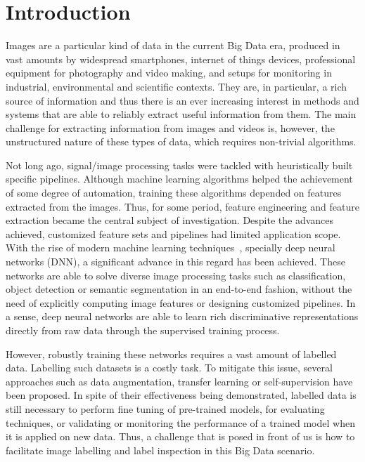 \documentclass[sn-basic]{sn-jnl}%
\theoremstyle{thmstyleone}%
\theoremstyle{thmstyletwo}%
\theoremstyle{thmstylethree}%
\begin{document}
\section{Introduction}\label{sec1}

Images are a particular kind of data in the current Big Data era, produced in vast amounts by widespread smartphones, internet of things devices, professional equipment for photography and video making, and setups for monitoring in industrial, environmental and scientific contexts. They are, in particular, a rich source of information and thus there is an ever increasing interest in methods and systems that are able to reliably extract useful information from them. The main challenge for extracting information from images and videos is, however, the unstructured nature of these types of data, which requires non-trivial algorithms.

Not long ago, signal/image processing tasks were tackled with heuristically built specific pipelines. Although machine learning algorithms helped the achievement of some degree of automation, training these algorithms depended on features extracted from the images. Thus, for some period, feature engineering and feature extraction became the central subject of investigation. Despite the advances achieved, customized feature sets and pipelines had limited application scope. With the rise of modern machine learning techniques~\citep{goodfellow-book}, specially deep neural networks (DNN), a significant advance in this regard has been achieved. These networks are able to solve diverse image processing tasks such as classification, object detection or semantic segmentation in an end-to-end fashion, without the need of explicitly computing image features or designing customized pipelines. In a sense, deep neural networks are able to learn rich discriminative representations directly from raw data through the supervised training process.

However, robustly training these networks requires a vast amount of labelled data. Labelling such datasets is a costly task. To mitigate this issue, several approaches such as data augmentation, transfer learning or self-supervision have been proposed. In spite of their effectiveness being demonstrated, labelled data is still necessary to perform fine tuning of pre-trained models, for evaluating techniques, or validating or monitoring the performance of a trained model when it is applied on new data. Thus, a challenge that is posed in front of us is how to facilitate image labelling and label inspection in this Big Data scenario.
\end{document}
